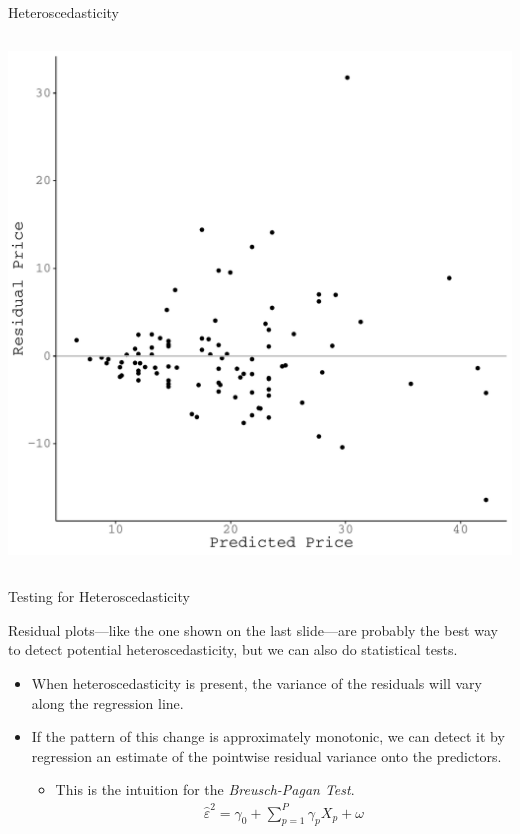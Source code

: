 \documentclass{beamer}\usepackage[]{graphicx}\usepackage[]{color}
\makeatletter
\def\maxwidth{ %
  \ifdim\Gin@nat@width>\linewidth
    \linewidth
  \else
    \Gin@nat@width
  \fi
}
\newenvironment{knitrout}{}{} %
\makeatother
\begin{document}
\begin{frame}{Heteroscedasticity}
\begin{columns}
\begin{column}{0.5\textwidth}
\begin{knitrout}
{\centering \includegraphics[width=\maxwidth]{figure/unnamed-chunk-6-1} 

}



\end{knitrout}

\end{column}
\end{columns}

\end{frame}

\watermarkon %

\begin{frame}{Testing for Heteroscedasticity}
  
  Residual plots---like the one shown on the last slide---are probably the best 
  way to detect potential heteroscedasticity, but we can also do statistical 
  tests.
  \vb
  \begin{itemize}
  \item When heteroscedasticity is present, the variance of the residuals will 
    vary along the regression line.
    \vc
  \item If the pattern of this change is approximately monotonic, we can detect 
    it by regression an estimate of the pointwise residual variance onto the 
    predictors.
    \vc
    \begin{itemize}
    \item This is the intuition for the \emph{Breusch-Pagan Test}.
      \begin{align*}
        \hat{\varepsilon}^2 = \gamma_0 + \sum_{p = 1}^P \gamma_p X_p + \omega
      \end{align*}
    \end{itemize}
  \end{itemize}
  
\end{frame}
\end{document}
